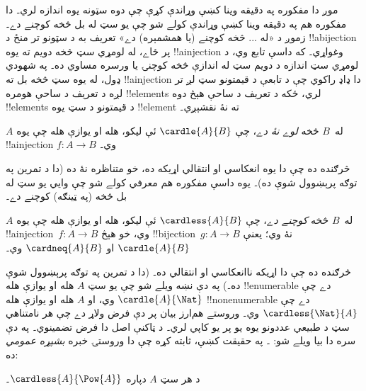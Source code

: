 \documentclass[../../../include/open-logic-section]{subfiles}
\begin{document}


\begin{explain}
موږ دا مفکوره په دقيقه وينا کښې وړاندې کړې چې دوه سټونه يوه
اندازه لري۔ دا مفکوره هم په دقيقه وينا کښې وړاندې کولے شو چې يو
سټ له بل څخه کوچنے دے۔ زموږ د «له ... څخه کوچنے (يا همشمېره)
دے» تعريف به د سټونو تر منځ د !!a{bijection} پر ځاے، له لومړي
سټ څخه دويم ته يوه !!a{injection} وغواړي۔ که داسې تابع وي، د
لومړي سټ اندازه د دويم سټ له اندازې څخه کوچنۍ يا ورسره مساوي ده۔
په شهودي ډول، له يوه سټ څخه بل ته !!a{injection} دا ډاډ راکوي
چې د تابعې د قيمتونو سټ لږ تر لږه د تعريف د ساحې هومره
!!{element}s لري، ځکه د تعريف د ساحې هېڅ دوه !!{element}s د
قيمتونو د سټ يوه !!{element} ته نۀ نقشېږي۔
\end{explain}

\begin{defn}
$A$ له~$B$ څخه \emph{لوے نۀ دے}، چې $\cardle{A}{B}$ ئې ليکو،
هله او يوازې هله چې يوه !!a{injection} $f \colon A \to B$ وي۔
\end{defn}

څرګنده ده چې دا يوه انعکاسي او انتقالي اړيکه ده، خو متناظره نۀ
ده (دا د تمرين په توګه پرېښوول شوې ده)۔ يوه داسې مفکوره هم
معرفي کولے شو چې وايي يو سټ له بل څخه (په ټينګه) کوچنے دے۔

\begin{defn}
$A$ له~$B$ څخه \emph{کوچنے دے}، چې $\cardless{A}{B}$ ئې ليکو،
هله او يوازې هله چې يوه !!a{injection}~$f\colon A \to B$ وي،
خو هېڅ !!{bijection}~$g\colon A \to B$ نۀ وي؛ يعنې
$\cardle{A}{B}$ او $\cardneq{A}{B}$ وي۔
\end{defn}

څرګنده ده چې دا اړيکه ناانعکاسي او انتقالي ده۔ (دا د تمرين په
توګه پرېښوول شوې ده۔) په دې نښه ويلے شو چې يو سټ $A$ هله او
يوازې هله !!{enumerable} دے چې $\cardle{A}{\Nat}$ وي، او $A$
هله او يوازې هله !!{nonenumerable} دے چې
$\cardless{\Nat}{A}$ وي۔
وروستے هم‌ارز بيان پر دې فرض ولاړ دے چې هر نامتناهي سټ
د طبيعي عددونو يوه يو پر يو کاپي لري۔ د ټاکنې اصل دا فرض
تضمينوي۔ په دې سره دا بيا ويلے شو:
۔ په
حقيقت کښې، \citet{Cantor1892} ثابته کړه چې دا وروستۍ خبره
\emph{بشپړه عمومي} ده:

\begin{thm}[کانتور]
د هر سټ $A$ دپاره $\cardless{A}{\Pow{A}}$۔
\end{thm}
\end{document}
